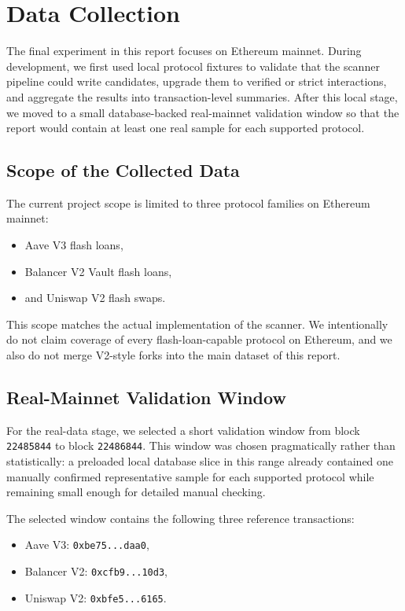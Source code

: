 \section{Data Collection}

The final experiment in this report focuses on Ethereum mainnet. During development, we first used local protocol fixtures to validate that the scanner pipeline could write candidates, upgrade them to verified or strict interactions, and aggregate the results into transaction-level summaries. After this local stage, we moved to a small database-backed real-mainnet validation window so that the report would contain at least one real sample for each supported protocol.

\subsection{Scope of the Collected Data}

The current project scope is limited to three protocol families on Ethereum mainnet:

\begin{itemize}[leftmargin=1.5em]
    \item Aave V3 flash loans,
    \item Balancer V2 Vault flash loans,
    \item and Uniswap V2 flash swaps.
\end{itemize}

This scope matches the actual implementation of the scanner. We intentionally do not claim coverage of every flash-loan-capable protocol on Ethereum, and we also do not merge V2-style forks into the main dataset of this report.

\subsection{Real-Mainnet Validation Window}

For the real-data stage, we selected a short validation window from block \texttt{22485844} to block \texttt{22486844}. This window was chosen pragmatically rather than statistically: a preloaded local database slice in this range already contained one manually confirmed representative sample for each supported protocol while remaining small enough for detailed manual checking.

The selected window contains the following three reference transactions:

\begin{itemize}[leftmargin=1.5em]
    \item Aave V3: \texttt{0xbe75...daa0},
    \item Balancer V2: \texttt{0xcfb9...10d3},
    \item Uniswap V2: \texttt{0xbfe5...6165}.
\end{itemize}


